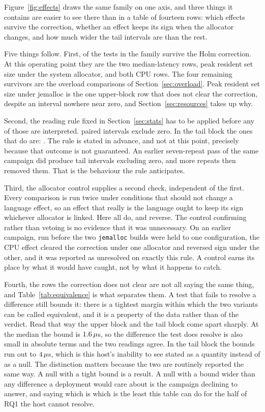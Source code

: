 \documentclass[english,oneside,a4paper,censored,csm,software-track-2020]{HYthesisML}
\begin{document}
Figure~\ref{fig:effects} draws the same family on one axis, and three things it contains are
easier to see there than in a table of fourteen rows: which effects survive the correction,
whether an effect keeps its sign when the allocator changes, and how much wider the tail
intervals are than the rest.

Five things follow. First, \NSignificant{} of the \NTests{} tests in the family survive the Holm
correction. At this operating point they are the two median-latency rows, peak resident set size
under the system allocator, and both CPU rows. The four remaining survivors are the overload
comparisons of Section~\ref{sec:overload}. Peak resident set size under jemalloc is the one
upper-block row that does not clear the correction, despite an interval nowhere near zero, and
Section~\ref{sec:resources} takes up why.

Second, the reading rule fixed in Section~\ref{sec:stats} has to be applied before any of those
are interpreted. \NExclZero{} paired intervals exclude zero. In the tail block the ones that do
are: \TailExclZeroRows. The rule is stated in advance, and not at this point, precisely
because that outcome is not guaranteed. An earlier seven-repeat pass of the same campaign did
produce tail intervals excluding zero, and more repeats then removed them. That is the behaviour
the rule anticipates.

Third, the allocator control supplies a second check, independent of the first. Every comparison
is run twice under conditions that should not change a language effect, so an effect that really
is the language ought to keep its sign whichever allocator is linked. Here
\CrossAllocConsistent{} all do, and \NCrossAllocReversed{} reverse. The control confirming rather
than vetoing is no evidence that it was unnecessary. On an earlier campaign, run before the
two \texttt{jemalloc} builds were held to one configuration, the CPU effect cleared the correction
under one allocator and reversed sign under the other, and it was reported as unresolved on
exactly this rule. A control earns its place by what it would have caught, not by what
it happens to catch.

Fourth, the \NEqvUnresolved{} rows the correction does not clear are not all saying the same
thing, and Table~\ref{tab:equivalence} is what separates them. A test that fails to resolve a
difference still bounds it: there is a tightest margin within which the two variants can be
called equivalent, and it is a property of the data rather than of the verdict. Read that way the
upper block and the tail block come apart sharply. At the median the bound is
$1.6\,\mu$s, so the difference the test does resolve is also small in absolute terms
and the two readings agree. In the tail block the bounds run out to $4\,\mu$s,
which is this host's inability to see stated as a quantity instead of as a null. The distinction
matters because the two are routinely reported the same way. A null with a tight bound is a
result. A null with a bound wider than any difference a deployment would care about is the
campaign declining to answer, and saying which is which is the least this table can do for the
half of RQ1 the host cannot resolve.
\end{document}

